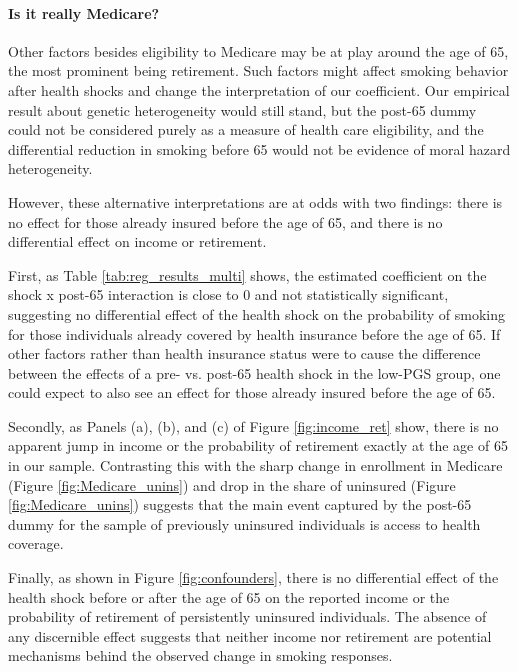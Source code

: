\documentclass[11pt]{article}
\begin{document}
\paragraph{Is it really Medicare?}
Other factors besides eligibility to Medicare may be at play around the age of 65, the most prominent being retirement.
Such factors might affect smoking behavior after health shocks and change the interpretation of our coefficient.
Our empirical result about genetic heterogeneity would still stand, but the post-65 dummy could not be considered purely as a measure of health care eligibility, and the differential reduction in smoking before 65 would not be evidence of moral hazard heterogeneity.

However, these alternative interpretations are at odds with two findings: there is no effect for those already insured before the age of 65, and there is no differential effect on income or retirement.

First, as Table \ref{tab:reg_results_multi} shows, the estimated coefficient on the \textsf{shock x post-65} interaction is close to 0 and not statistically significant, suggesting no differential effect of the health shock on the probability of smoking for those individuals already covered by health insurance before the age of 65.
If other factors rather than health insurance status were to cause the difference between the effects of a pre- vs. post-65 health shock in the low-PGS group, one could expect to also see an effect for those already insured before the age of 65.

Secondly, as Panels (a), (b), and (c) of Figure \ref{fig:income_ret} show, there is no apparent jump in income or the probability of retirement exactly at the age of 65 in our sample.
Contrasting this with the sharp change in enrollment in Medicare (Figure \ref{fig:Medicare_unins}) and drop in the share of uninsured (Figure \ref{fig:Medicare_unins}) suggests that the main event captured by the post-65 dummy for the sample of previously uninsured individuals is access to health coverage.

Finally, as shown in Figure \ref{fig:confounders}, there is no differential effect of the health shock before or after the age of 65 on the reported income or the probability of retirement of persistently uninsured individuals.
The absence of any discernible effect suggests that neither income nor retirement are potential mechanisms behind the observed change in smoking responses.
\end{document}
